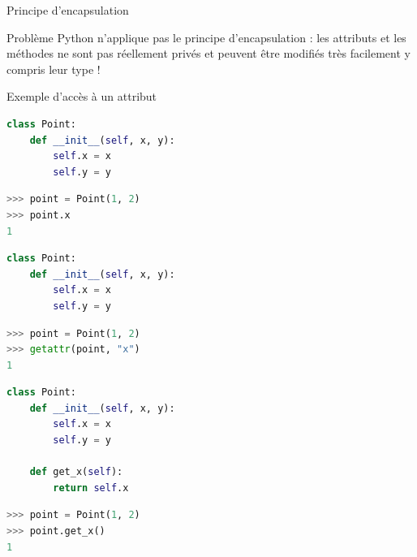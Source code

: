 \documentclass[10pt]{beamer}
\begin{document}
\begin{frame}{Principe d'encapsulation}

  \begin{block}{Problème}
    \medskip
    Python n'applique pas le principe d'encapsulation : les attributs et les méthodes ne sont pas réellement privés et peuvent être modifiés très facilement y compris leur type !
  \end{block}
\end{frame}

\begin{frame}[fragile]{Exemple d'accès à un attribut}

\begin{overprint}

\begin{lstlisting}[language=Python, numbers=none]
class Point:
    def __init__(self, x, y):
        self.x = x
        self.y = y
\end{lstlisting}

\begin{lstlisting}[language=Python, numbers=none]
>>> point = Point(1, 2)
>>> point.x
1
\end{lstlisting}

\begin{lstlisting}[language=Python, numbers=none]
class Point:
    def __init__(self, x, y):
        self.x = x
        self.y = y
\end{lstlisting}

\begin{lstlisting}[language=Python, numbers=none]
>>> point = Point(1, 2)
>>> getattr(point, "x")
1
\end{lstlisting}


\begin{lstlisting}[language=Python, numbers=none]
class Point:
    def __init__(self, x, y):
        self.x = x
        self.y = y

    def get_x(self):
        return self.x
\end{lstlisting}

\begin{lstlisting}[language=Python, numbers=none]
>>> point = Point(1, 2)
>>> point.get_x()
1
\end{lstlisting}

\end{overprint}

\end{frame}
\end{document}
